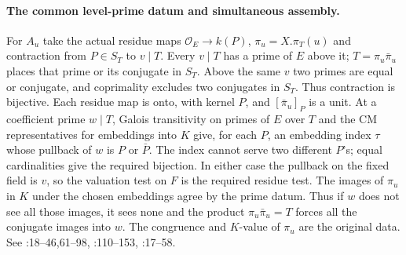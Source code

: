 \paragraph{The common level-prime datum and simultaneous assembly.}
For $A_u$ take the actual residue maps $\mathcal O_E\to k(P)$,
$\pi_u=X.\pi_T(u)$ and contraction from $P\in S_T$ to $v\mid T$.
Every $v\mid T$ has a prime of $E$ above it; $T=\pi_u\bar\pi_u$
places that prime or its conjugate in $S_T$. Above the same $v$ two
primes are equal or conjugate, and coprimality excludes two conjugates
in $S_T$. Thus contraction is bijective. Each residue map is onto,
with kernel $P$, and $[\bar\pi_u]_P$ is a unit. At a coefficient prime
$w\mid T$, Galois transitivity on primes of $E$ over $T$ and the CM
representatives for embeddings into $K$ give, for each $P$, an embedding
index $\tau$ whose pullback of $w$ is $P$ or $\bar P$. The index cannot
serve two different $P$'s; equal cardinalities give the required
bijection. In either case the pullback on the fixed field is $v$,
so the valuation test on $F$ is the required residue test. The images
of $\pi_u$ in $K$ under the chosen embeddings agree by the prime datum.
Thus if $w$ does not see all those images, it sees none and the
product $\pi_u\bar\pi_u=T$ forces all the conjugate images into $w$.
The congruence and $K$-value of $\pi_u$ are the original data.
See :18--46,61--98,
:110--153,
:17--58.

